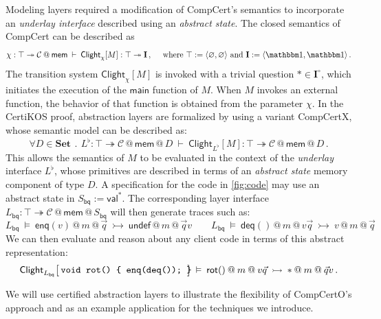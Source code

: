 \documentclass[acmsmall,screen,review,anonymous]{acmart}
\newcommand{\kw}[1]{\ensuremath{ \mathsf{#1} }}
\newcommand{\que}{\circ}
\begin{document}
\begin{example}
Modeling layers required a modification of CompCert's semantics
to incorporate an \emph{underlay interface}
described using an \emph{abstract state}.
The closed semantics of CompCert can be described as
\[
  \chi : \top \twoheadrightarrow \mathcal{C} \mathbin@ \kw{mem}
  \: \vdash \:
  \kw{Clight}_\chi[M] : \top \twoheadrightarrow \mathbf{I}
  \,,
  \quad \text{ where }
  \top := \langle \varnothing, \varnothing \rangle
  \text{ and }
  \mathbf{I} := \langle \mathbbm1, \mathbbm1 \rangle
  \,.
\]
The transition system $\kw{Clight}_\chi[M]$
is invoked with a trivial question ${*} \in \mathbf{I}^\que$,
which initiates the execution of the $\kw{main}$ function of $M$.
When $M$ invokes an external function,
the behavior of that function is obtained from the parameter $\chi$.
In the CertiKOS proof,
abstraction layers are formalized by using
a variant CompCertX,
whose semantic model can be described as:
\[
  \forall D \in \mathbf{Set}
  \: \mathbin. \:
  L^\flat :
    \top \twoheadrightarrow
    \mathcal{C} \mathbin@ \kw{mem} \mathbin@ D
  \: \vdash \:
  \kw{Clight}_{L^\flat}[M] :
    \top \twoheadrightarrow
    \mathcal{C} \mathbin@ \kw{mem} \mathbin@ D
  \,.
\]
This allows the semantics of $M$ to be evaluated
in the context of the \emph{underlay} interface $L^\flat$,
whose primitives are described in terms of
an \emph{abstract state} memory component of type $D$.
A specification for the code in \autoref{fig:code}
may use an abstract state in $S_\kw{bq} := \kw{val}^*$.
The corresponding layer interface
$L_\kw{bq} : \top \twoheadrightarrow
 \mathcal{C} \mathbin@ \kw{mem} \mathbin@ S_\kw{bq}$
will then generate traces such as:
\[
  L_\kw{bq} \:\vDash\:
  \kw{enq}(v) \mathbin@ m \mathbin@ \vec{q}
  \:\rightarrowtail\:
  \kw{undef} \mathbin@ m \mathbin@ \vec{q}v
  \qquad%
  L_\kw{bq} \:\vDash\:
  \kw{deq}() \mathbin@ m \mathbin@ v\vec{q}
  \:\rightarrowtail\:
  v \mathbin@ m \mathbin@ \vec{q}
\]
We can then evaluate and reason about any client code
in terms of this abstract representation:
\[
  \kw{Clight}_{L_\kw{bq}} \big[\,
  \begin{minipage}{13em}
\begin{verbatim}
void rot() { enq(deq()); }
\end{verbatim}
  \end{minipage} \,\big]
\:\vDash\:
  \kw{rot}() \mathbin@ m \mathbin@ v\vec{q}
  \:\rightarrowtail\:
  {*} \mathbin@ m \mathbin@ \vec{q}v
  \,.
\]

We will use certified abstraction layers
to illustrate the flexibility of CompCertO's approach
and as an example application for the techniques we introduce.
\end{example}
\end{document}
